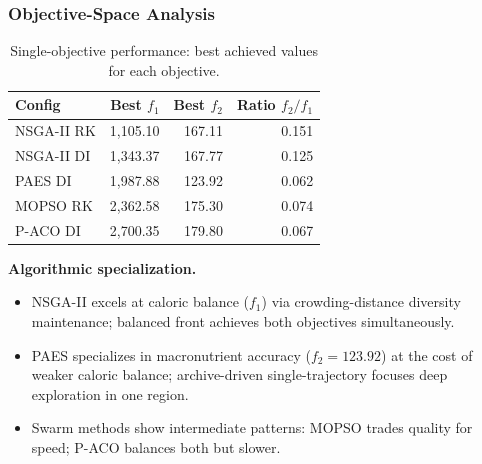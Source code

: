 \documentclass[aspectratio=169,10pt]{beamer}
\begin{document}
\begin{frame}
\frametitle{Objective-Space Analysis}

\begin{table}
\centering\small
\begin{tabular}{lrrr}
\toprule
\textbf{Config} & \textbf{Best $f_1$} & \textbf{Best $f_2$} & \textbf{Ratio $f_2/f_1$} \\
\midrule
NSGA-II RK & 1,105.10 & 167.11 & 0.151 \\
NSGA-II DI & 1,343.37 & 167.77 & 0.125 \\
PAES DI & 1,987.88 & 123.92 & 0.062 \\
MOPSO RK & 2,362.58 & 175.30 & 0.074 \\
P-ACO DI & 2,700.35 & 179.80 & 0.067 \\
\bottomrule
\end{tabular}
\caption{Single-objective performance: best achieved values for each objective.}
\end{table}

\vspace{0.2cm}

\textbf{Algorithmic specialization.}
\begin{itemize}
  \item NSGA-II excels at caloric balance ($f_1$) via crowding-distance diversity maintenance; balanced front achieves both objectives simultaneously.
  \item PAES specializes in macronutrient accuracy ($f_2 = 123.92$) at the cost of weaker caloric balance; archive-driven single-trajectory focuses deep exploration in one region.
  \item Swarm methods show intermediate patterns: MOPSO trades quality for speed; P-ACO balances both but slower.
\end{itemize}

\end{frame}
\end{document}
